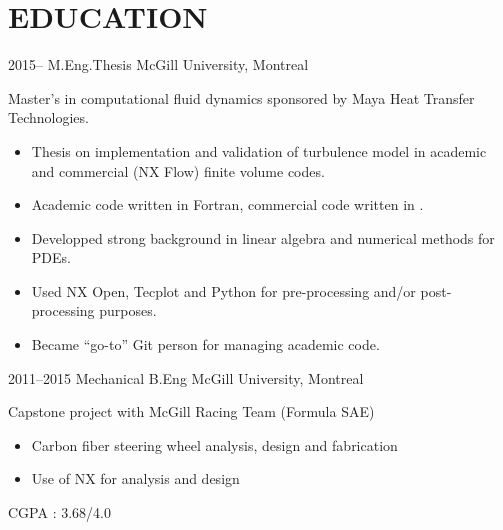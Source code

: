 
\section{EDUCATION}
%
\begin{entrylist}
\entry
{2015--}
{M.Eng.Thesis %
}
{McGill University, Montreal}
{%
Master's in computational fluid dynamics sponsored by Maya Heat Transfer Technologies.
\begin{itemize}
\item Thesis on implementation and validation of turbulence model in academic and commercial (NX Flow) finite volume codes.
\item Academic code written in Fortran, commercial code written in \CC.
\item Developped strong background in linear algebra and numerical methods for PDEs.
\item Used NX Open, Tecplot and Python for pre-processing and/or post-processing purposes.
\item Became ``go-to'' Git person for managing academic code.
\end{itemize}
}
%
\entry
{2011--2015}
{Mechanical B.Eng %
}
{McGill University, Montreal}
{%
Capstone project with McGill Racing Team (Formula SAE)
\begin{itemize}
\item Carbon fiber steering wheel analysis, design and fabrication
\item Use of NX for analysis and design
\end{itemize}
CGPA : 3.68/4.0
}
\end{entrylist}
%
%
%

